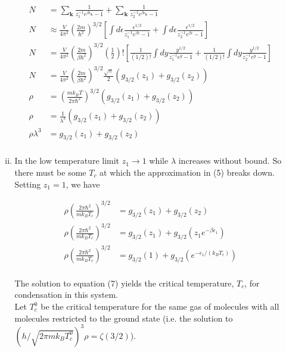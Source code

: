 \documentclass[]{article}
\begin{document}
\begin{enumerate}[1.]
\begin{enumerate}[i.]
\begin{equation}
\begin{split}
N & = \sum_{\bm{k}} \frac{ 1 }{   z_1^{-1} e^{\beta\epsilon_{\bm{k}}}   - 1} +  \sum_{\bm{k}}  \frac{ 1 }{   z_2^{-1} e^{\beta\epsilon_{\bm{k}} }  -  1  }  \\
N & \approx \frac{V}{4\pi^2} \left( \frac{2m}{\hbar^2} \right)^{3/2}  \left[  \int d\epsilon \frac{ \epsilon^{1/2} }{  z_1^{-1} e^{\beta\epsilon}  -  1  } + \int d\epsilon \frac{ \epsilon^{1/2} }{  z_2^{-1} e^{\beta\epsilon}  -  1  }  \right] \\
N & = \frac{V}{4\pi^2} \left( \frac{2m}{\beta\hbar^2} \right)^{3/2} \left( \frac{1}{2}  \right)! \left[ \frac{1}{(1/2)!} \int dy  \frac{ y^{1/2} }{  z_1^{-1} e^{y}  -  1  } + \frac{1}{(1/2)!}\int dy \frac{ y^{1/2} }{  z_2^{-1} e^{y}  -  1  }  \right] \\
N & = \frac{V}{4\pi^2} \left( \frac{2m}{\beta\hbar^2} \right)^{3/2}  \frac{\sqrt{\pi}}{2}  \left( g_{3/2}(z_1) + g_{3/2}(z_2)  \right) \\
\rho & =  \left( \frac{mk_BT}{2\pi\hbar^2} \right)^{3/2}   \left( g_{3/2}(z_1) + g_{3/2}(z_2)  \right) \\
\rho & = \frac{1}{\lambda^3}  \left( g_{3/2}(z_1) + g_{3/2}(z_2)  \right) \\
\rho\lambda^3 & =   g_{3/2}(z_1) + g_{3/2}(z_2) \\
\end{split}
\end{equation}

\item In the low temperature limit $z_1 \to 1$ while $\lambda$ increases without bound. So there must be some $T_c$ at which the approximation in (5) breaks down. Setting $z_1 = 1$, we have

\begin{equation}
\begin{split}
\rho  \left( \frac{2\pi\hbar^2} {mk_BT_c}\right)^{3/2}  & =   g_{3/2}(z_1) + g_{3/2}(z_2) \\
\rho \left( \frac{2\pi\hbar^2} {mk_BT_c}\right)^{3/2}  & =   g_{3/2}(z_1) + g_{3/2}(z_1 e^{-\beta\epsilon_1}) \\
\rho \left( \frac{2\pi\hbar^2}{mk_BT_c} \right)^{3/2}  & =   g_{3/2}(1) + g_{3/2}( e^{-\epsilon_1/(k_BT_c)}) \\
\end{split}
\end{equation}

The solution to equation (7) yields the critical temperature, $T_c$, for condensation in this system. \\
Let $T_c^0$ be the critical temperature for the same gas of molecules with all molecules restricted to the ground state (i.e. the solution to $(h/\sqrt{2\pi m k_BT_c^0})^3\rho = \zeta(3/2)$). 


\end{enumerate}
\end{enumerate}
\end{document}
